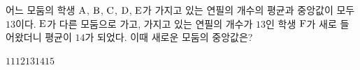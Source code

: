 어느 모둠의 학생 $\mathrm{A}$, $\mathrm{B}$, $\mathrm{C}$, $\mathrm{D}$, $\mathrm{E}$가 가지고 있는 연필의 개수의 평균과 중앙값이 모두 $13$이다. $\mathrm{E}$가 다른 모둠으로 가고, 가지고 있는 연필의 개수가 $13$인 학생 $\mathrm{F}$가 새로 들어왔더니 평균이 $14$가 되었다. 이때 새로운 모둠의 중앙값은?
\begin{choices32}{$11$}{$12$}{$13$}{$14$}{$15$}\end{choices32}
